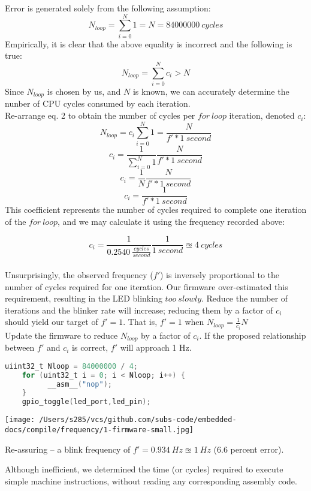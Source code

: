 \documentclass[a4paper,12pt]{article}   	%
\begin{document}
\begin{flushleft}

Error is generated solely from the following assumption:
$$N_{loop} = \sum_{i=0}^{N}1 = N = 84000000\ cycles$$
Empirically, it is clear that the above equality is incorrect and the following is true:
$$N_{loop} = \sum_{i=0}^{N}c_i > N$$
Since $N_{loop}$ is chosen by us, and $N$ is known, we can accurately 
determine the nunber of CPU cycles consumed by each iteration.\\[2 ex]

Re-arrange eq. 2 to obtain the number of cycles per $for\ loop$ iteration, denoted $c_i$:
$$N_{loop} = c_i\sum_{i=0}^{N} 1 = \frac{N}{f' * 1\ second}$$
$$c_i = \frac{1}{\sum_{i=0}^{N} 1} \frac{N}{f' * 1\ second}$$
$$c_i = \frac{1}{N} \frac{N}{f'*1\ second}$$
$$c_i = \frac{1}{f' * 1\ second}$$
This coefficient represents the 
number of cycles required to complete one iteration of the $for\ loop$, and 
we may calculate it using the frequency recorded above:

$$c_i = \frac{1}{0.2540\ \frac{cycles}{second}} \frac{1}{1\ second} \approxeq 4\ cycles$$\\[1 ex]

Unsurprisingly, the observed frequency ($f'$) is inversely proportional to the number of cycles required for one iteration.
Our firmware over-estimated this requirement, resulting in the LED blinking $too\ slowly$. 
Reduce the number of iterations and the blinker rate will increase; reducing them by a factor of $c_i$ should yield our target of $f' = 1$.
That is, $f' = 1$ when $N_{loop} = \frac{1}{c_i}N$\\[2 ex]

Update the firmware to reduce $N_{loop}$ by a factor of $c_i$. If the proposed relationship between $f'$ and $c_i$ is correct, 
$f'$ will approach 1 Hz.\\[2 ex]

\begin{lstlisting}[backgroundcolor = \color{beige},
    language = C,
    xleftmargin = 1cm,
    framexleftmargin = 1em]
    uiint32_t Nloop = 84000000 / 4;
    for (uint32_t i = 0; i < Nloop; i++) {
          __asm__("nop");
    }
    gpio_toggle(led_port,led_pin);
    \end{lstlisting}

\begin{center}
    \texttt{[image: /Users/s285/vcs/github.com/subs-code/embedded-docs/compile/frequency/1-firmware-small.jpg]}
\end{center}

Re-assuring -- a blink frequency of $f' = 0.934\ Hz \approxeq 1\ Hz$ (6.6 percent error). 

Although inefficient, we determined the time (or cycles) required 
to execute simple machine instructions, without reading any corresponding assembly code.\\[0 ex]

\end{flushleft}
\end{document}
